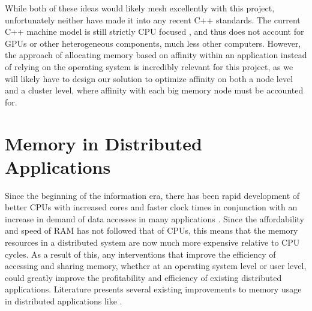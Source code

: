 While both of these ideas would likely mesh excellently with this project, unfortunately neither have made it into any recent C++ standards. The current C++ machine model is still strictly CPU focused \cite{towards_dist_cpp}, and thus does not account for GPUs or other heterogeneous components, much less other computers. However, the approach of allocating memory based on affinity within an application instead of relying on the operating system is incredibly relevant for this project, as we will likely have to design our solution to optimize affinity on both a node level and a cluster level, where affinity with each big memory node must be accounted for.  

\section{Memory in Distributed Applications} \label{memory_distrib}
Since the beginning of the information era, there has been rapid development of better CPUs with increased cores and faster clock times in conjunction with an increase in demand of data accesses in many applications \cite{sharing_cpu_memory}. Since the affordability and speed of RAM has not followed that of CPUs, this means that the memory resources in a distributed system are now much more expensive relative to CPU cycles. As a result of this, any interventions that improve the efficiency of accessing and sharing memory, whether at an operating system level or user level, could greatly improve the profitability and efficiency of existing distributed applications. Literature presents several existing improvements to memory usage in distributed applications like \cite{virtual_memory_tlb} \cite{sharing_cpu_memory}.


